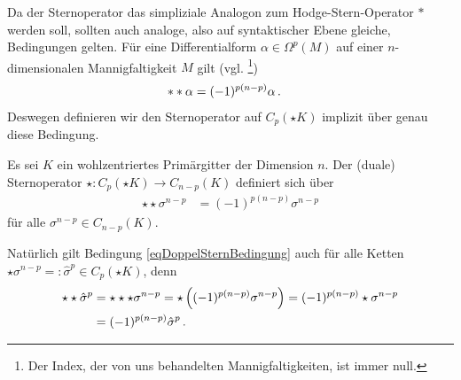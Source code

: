   Da der Sternoperator das simpliziale Analogon zum Hodge-Stern-Operator \( * \) werden soll, sollten auch analoge, also auf syntaktischer Ebene gleiche, Bedingungen gelten.
  Für eine Differentialform \( \alpha\in\Omega^{p}(M) \) auf einer \( n \)-dimensionalen Mannigfaltigkeit \( M \) gilt 
  (vgl. \cite[ Kap.6.2.]{Marsden}\footnote{Der Index, der von uns behandelten Mannigfaltigkeiten, ist immer null.})
  \begin{align}
    **\alpha &= (-1)^{p(n-p)}\alpha \,\text{.}
  \end{align}
  Deswegen definieren wir den Sternoperator auf \( C_{p}(\star K) \) implizit über genau diese Bedingung.

  \begin{definition}
    \label{defDoppelSternBedingung}
    Es sei \( K \) ein wohlzentriertes Primärgitter der Dimension \( n \).
    Der (duale) Sternoperator \( \star: C_{p}(\star K) \rightarrow   C_{n-p}(K) \) definiert sich über
    \begin{align}
      \label{eqDoppelSternBedingung}
      \star\star \sigma^{n-p} &= (-1)^{p(n-p)}\sigma^{n-p}
    \end{align}
    für alle \( \sigma^{n-p} \in C_{n-p}(K) \).
  \end{definition}
  Natürlich gilt Bedingung \eqref{eqDoppelSternBedingung} auch für alle Ketten \( \star\sigma^{n-p} =: \hat{\sigma}^{p} \in C_{p}(\star K)\), denn
  \begin{align}
    \begin{aligned}
    \star\star\hat{\sigma}^{p} &= \star\star\star\sigma^{n-p} = \star\left((-1)^{p(n-p)}\sigma^{n-p}\right)
                                = (-1)^{p(n-p)}\star\sigma^{n-p} \\
                                &=  (-1)^{p(n-p)}\hat{\sigma}^{p} \,\text{.}
    \end{aligned}
  \end{align}

